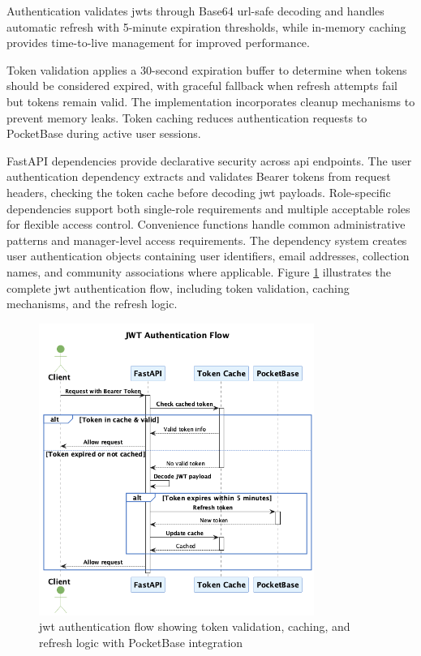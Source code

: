 Authentication validates \acp{jwt} through Base64 \acs{url}-safe decoding and handles automatic refresh with 5-minute expiration thresholds, while in-memory caching provides time-to-live management for improved performance.

Token validation applies a 30-second expiration buffer to determine when tokens should be considered expired, with graceful fallback when refresh attempts fail but tokens remain valid. The implementation incorporates cleanup mechanisms to prevent memory leaks. Token caching reduces authentication requests to PocketBase during active user sessions.

FastAPI dependencies provide declarative security across \ac{api} endpoints. The user authentication dependency extracts and validates Bearer tokens from request headers, checking the token cache before decoding \ac{jwt} payloads. Role-specific dependencies support both single-role requirements and multiple acceptable roles for flexible access control. Convenience functions handle common administrative patterns and manager-level access requirements. The dependency system creates user authentication objects containing user identifiers, email addresses, collection names, and community associations where applicable. Figure \ref{fig:jwt_auth_sequence} illustrates the complete \ac{jwt} authentication flow, including token validation, caching mechanisms, and the refresh logic.

\begin{figure}[htbp]
    \centering
    \includegraphics[width=0.8\textwidth]{figs/chapter4/jwt_auth_simple.png}
    \caption[\acs{jwt} Authentication Flow]{\ac{jwt} authentication flow showing token validation, caching, and refresh logic with PocketBase integration}
    \label{fig:jwt_auth_sequence}
\end{figure}

